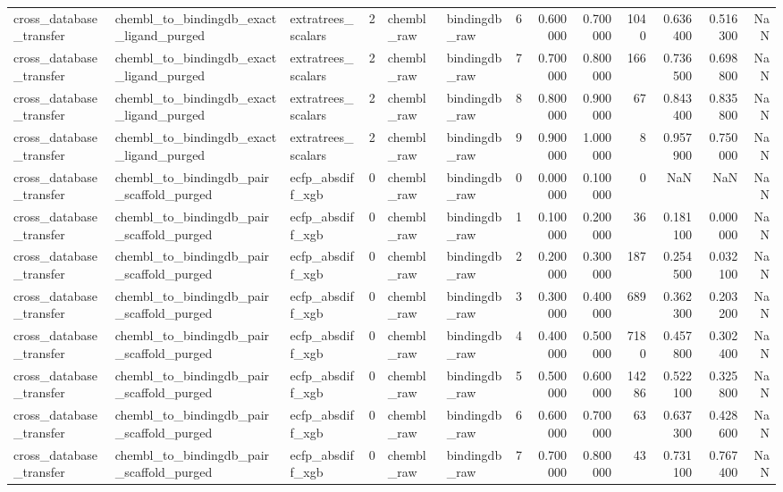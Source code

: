 \begin{longtable}{lllrllrrrrrrr}
cross\_database\_transfer & chembl\_to\_bindingdb\_exact\_ligand\_purged & extratrees\_scalars & 2 & chembl\_raw & bindingdb\_raw & 6 & 0.600000 & 0.700000 & 1040 & 0.636400 & 0.516300 & NaN \\
cross\_database\_transfer & chembl\_to\_bindingdb\_exact\_ligand\_purged & extratrees\_scalars & 2 & chembl\_raw & bindingdb\_raw & 7 & 0.700000 & 0.800000 & 166 & 0.736500 & 0.698800 & NaN \\
cross\_database\_transfer & chembl\_to\_bindingdb\_exact\_ligand\_purged & extratrees\_scalars & 2 & chembl\_raw & bindingdb\_raw & 8 & 0.800000 & 0.900000 & 67 & 0.843400 & 0.835800 & NaN \\
cross\_database\_transfer & chembl\_to\_bindingdb\_exact\_ligand\_purged & extratrees\_scalars & 2 & chembl\_raw & bindingdb\_raw & 9 & 0.900000 & 1.000000 & 8 & 0.957900 & 0.750000 & NaN \\
cross\_database\_transfer & chembl\_to\_bindingdb\_pair\_scaffold\_purged & ecfp\_absdiff\_xgb & 0 & chembl\_raw & bindingdb\_raw & 0 & 0.000000 & 0.100000 & 0 & NaN & NaN & NaN \\
cross\_database\_transfer & chembl\_to\_bindingdb\_pair\_scaffold\_purged & ecfp\_absdiff\_xgb & 0 & chembl\_raw & bindingdb\_raw & 1 & 0.100000 & 0.200000 & 36 & 0.181100 & 0.000000 & NaN \\
cross\_database\_transfer & chembl\_to\_bindingdb\_pair\_scaffold\_purged & ecfp\_absdiff\_xgb & 0 & chembl\_raw & bindingdb\_raw & 2 & 0.200000 & 0.300000 & 187 & 0.254500 & 0.032100 & NaN \\
cross\_database\_transfer & chembl\_to\_bindingdb\_pair\_scaffold\_purged & ecfp\_absdiff\_xgb & 0 & chembl\_raw & bindingdb\_raw & 3 & 0.300000 & 0.400000 & 689 & 0.362300 & 0.203200 & NaN \\
cross\_database\_transfer & chembl\_to\_bindingdb\_pair\_scaffold\_purged & ecfp\_absdiff\_xgb & 0 & chembl\_raw & bindingdb\_raw & 4 & 0.400000 & 0.500000 & 7180 & 0.457800 & 0.302400 & NaN \\
cross\_database\_transfer & chembl\_to\_bindingdb\_pair\_scaffold\_purged & ecfp\_absdiff\_xgb & 0 & chembl\_raw & bindingdb\_raw & 5 & 0.500000 & 0.600000 & 14286 & 0.522100 & 0.325800 & NaN \\
cross\_database\_transfer & chembl\_to\_bindingdb\_pair\_scaffold\_purged & ecfp\_absdiff\_xgb & 0 & chembl\_raw & bindingdb\_raw & 6 & 0.600000 & 0.700000 & 63 & 0.637300 & 0.428600 & NaN \\
cross\_database\_transfer & chembl\_to\_bindingdb\_pair\_scaffold\_purged & ecfp\_absdiff\_xgb & 0 & chembl\_raw & bindingdb\_raw & 7 & 0.700000 & 0.800000 & 43 & 0.731100 & 0.767400 & NaN \\

\end{longtable}
